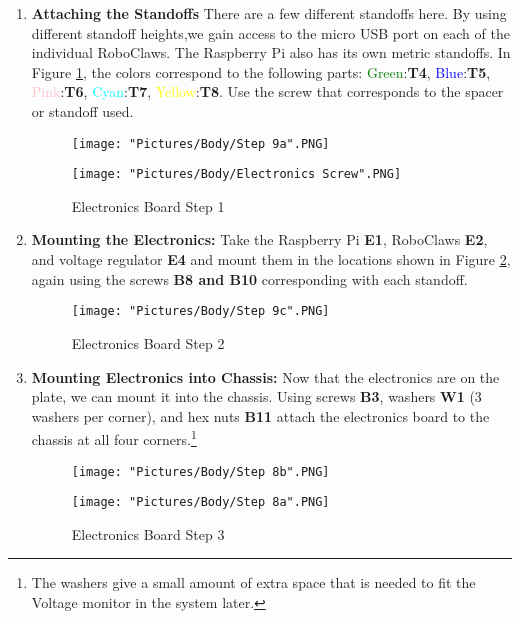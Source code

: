\documentclass[12pt]{article}
\begin{document}
\begin{enumerate}
\item \textbf{Attaching the Standoffs} There are a few different standoffs here. By using different standoff heights,we gain access to the micro USB port on each of the individual RoboClaws. The Raspberry Pi also has its own metric standoffs. In Figure \ref{standoffs}, the colors correspond to the following parts: \textcolor{green}{Green}:\textbf{T4}, \textcolor{blue}{Blue}:\textbf{T5}, \textcolor{pink}{Pink}:\textbf{T6}, \textcolor{cyan}{Cyan}:\textbf{T7}, \textcolor{yellow}{Yellow}:\textbf{T8}. Use the screw that corresponds to the spacer or standoff used.

\begin{figure}[H]
  \centering
  \begin{minipage}[b]{0.50\textwidth}
    \texttt{[image: "Pictures/Body/Step 9a".PNG]}
  \end{minipage}
  \hfill
  \begin{minipage}[b]{0.35\textwidth}
    \texttt{[image: "Pictures/Body/Electronics Screw".PNG]}
  \end{minipage}

  \caption{Electronics Board Step 1}
  \label{standoffs}
\end{figure}

\item \textbf{Mounting the Electronics:} Take the Raspberry Pi \textbf{E1}, RoboClaws \textbf{E2}, and voltage regulator \textbf{E4} and mount them in the locations shown in Figure \ref{electronics board 2}, again using the screws \textbf{B8 and B10} corresponding with each standoff.

\begin{figure}[H]
\centering
  \texttt{[image: "Pictures/Body/Step 9c".PNG]}
  \caption{Electronics Board Step 2}
  \label{electronics board 2}
\end{figure}


\item \textbf{Mounting Electronics into Chassis:} Now that the electronics are on the plate, we can mount it into the chassis. Using screws \textbf{B3}, washers \textbf{W1} (3 washers per corner), and hex nuts \textbf{B11} attach the electronics board to the chassis at all four corners.\footnote{The washers give a small amount of extra space that is needed to fit the Voltage monitor in the system later.}

\begin{figure}[H]
  \centering
  \begin{minipage}[b]{0.40\textwidth}
    \texttt{[image: "Pictures/Body/Step 8b".PNG]}
  \end{minipage}
  \hfill
  \begin{minipage}[b]{0.40\textwidth}
    \texttt{[image: "Pictures/Body/Step 8a".PNG]}
  \end{minipage}
  \caption{Electronics Board Step 3}
\end{figure}
\end{enumerate}
\end{document}
